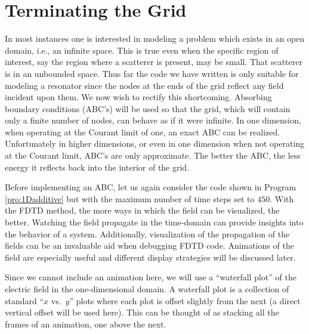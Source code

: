 \section{Terminating the Grid \label{sec:terminate}}

In most instances one is interested in modeling a problem which exists
in an open domain, i.e., an infinite space.  This is true even when
the specific region of interest, say the region where a scatterer is
present, may be small.  That scatterer is in an unbounded space.  Thus
far the code we have written is only suitable for modeling a resonator
since the nodes at the ends of the grid reflect any field incident
upon them.  We now wish to rectify this shortcoming.  Absorbing
boundary conditions (ABC's) will be used so that the grid, which will
contain only a finite number of nodes, can behave as if it were
infinite.  In one dimension, when operating at the Courant limit of
one, an exact ABC can be realized.  Unfortunately in higher
dimensions, or even in one dimension when not operating at the Courant
limit, ABC's are only approximate.  The better the ABC, the less
energy it reflects back into the interior of the grid.

Before implementing an ABC, let us again consider the code shown in
Program \ref{pro:1Dadditive} but with the maximum number of time steps
set to $450$.  With the FDTD method, the more ways in which the field
can be visualized, the better.  Watching the field propagate in the
time-domain can provide insights into the behavior of a system.
Additionally, visualization of the propagation of the fields can be an
invaluable aid when debugging FDTD code.  Animations of the field are
especially useful and different display strategies will be discussed
later.  

Since we cannot include an animation here, we will use a ``waterfall
plot''  of the electric field in the
one-dimensional domain.  A waterfall plot is a collection of standard
``$x$ vs.\ $y$'' plots where each plot is offset slightly from the
next (a direct vertical offset will be used here).  This can be
thought of as stacking all the frames of an animation, one above the
next.

